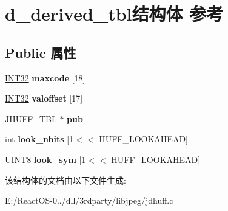 \hypertarget{structd__derived__tbl}{}\section{d\+\_\+derived\+\_\+tbl结构体 参考}
\label{structd__derived__tbl}
\subsection*{Public 属性}
\begin{DoxyCompactItemize}
\item 
\mbox{\label{structd__derived__tbl_a4e226d20d913f1c516bd98a930008ad1}} 
\hyperlink{_processor_bind_8h_a1137216524060afd426c34677fed058b}{I\+N\+T32} {\bfseries maxcode} \mbox{[}18\mbox{]}
\item 
\mbox{\label{structd__derived__tbl_a67397b3869145321a25d2df17a0c11ec}} 
\hyperlink{_processor_bind_8h_a1137216524060afd426c34677fed058b}{I\+N\+T32} {\bfseries valoffset} \mbox{[}17\mbox{]}
\item 
\mbox{\label{structd__derived__tbl_a816f4c07d3173cd1a96ef146acabf6c6}} 
\hyperlink{struct_j_h_u_f_f___t_b_l}{J\+H\+U\+F\+F\+\_\+\+T\+BL} $\ast$ {\bfseries pub}
\item 
\mbox{\label{structd__derived__tbl_a69e9228ebe44420f896c147bcb8b2f4b}} 
int {\bfseries look\+\_\+nbits} \mbox{[}1$<$$<$ H\+U\+F\+F\+\_\+\+L\+O\+O\+K\+A\+H\+E\+AD\mbox{]}
\item 
\mbox{\label{structd__derived__tbl_a526051256461864bc8395d1f6d1a82fd}} 
\hyperlink{_processor_bind_8h_ab27e9918b538ce9d8ca692479b375b6a}{U\+I\+N\+T8} {\bfseries look\+\_\+sym} \mbox{[}1$<$$<$ H\+U\+F\+F\+\_\+\+L\+O\+O\+K\+A\+H\+E\+AD\mbox{]}
\end{DoxyCompactItemize}


该结构体的文档由以下文件生成\+:\begin{DoxyCompactItemize}
\item 
E\+:/\+React\+O\+S-\/0../dll/3rdparty/libjpeg/jdhuff.\+c\end{DoxyCompactItemize}
